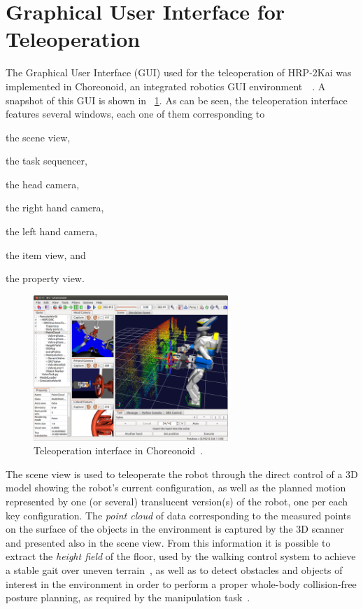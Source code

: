 \section{Graphical User Interface for Teleoperation}
	\label{sec:teleoperation_gui}
	
	The Graphical User Interface (GUI) used for the teleoperation of HRP-2Kai was implemented
	in Choreonoid, an integrated robotics GUI environment~\cite{Choreonoid}~\cite{Nakaoka_Choreonoid}.
	A snapshot of this GUI is shown in \figurename~\ref{fig:Choreonoid3}.
	As can be seen, the teleoperation interface features several windows, each one of them
	corresponding to
	\begin{inparaenum}[(1)]
		\item the scene view,
		\item the task sequencer,
		\item the head camera,
		\item the right hand camera,
		\item the left hand camera,
		\item the item view, and
		\item the property view.
	\end{inparaenum}
		
	\begin{figure}[t]
		\centering
		\includegraphics[height = 5.5cm]{img/Choreonoid3}
		\caption{Teleoperation interface in Choreonoid~\cite{Nakaoka_Humanoids}.}
		\label{fig:Choreonoid3}
	\end{figure}
	
	The scene view is used to teleoperate the robot through the direct control of a 3D model
	showing the robot's current configuration, as well as the planned motion represented by
	one (or several) translucent version(s) of the robot, one per each key configuration.
	The \emph{point cloud} of data corresponding to the measured points on the surface of the
	objects in the environment is captured by the 3D scanner and presented also in the scene view.
	From this information it is possible to extract the \emph{height field} of the floor,
	used by the walking control system to achieve a stable gait over uneven terrain~\cite{Morisawa},
	as well as to detect obstacles and objects of interest in the environment in order to perform
	a proper whole-body collision-free posture planning, as required by the manipulation
	task~\cite{Kanoun}.
	
